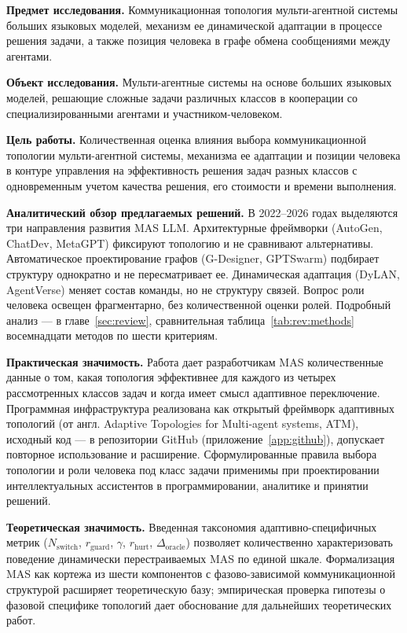 \textbf{Предмет исследования.} Коммуникационная топология
мульти-агентной системы больших языковых моделей, механизм
ее динамической адаптации в процессе решения задачи, а также
позиция человека в графе обмена сообщениями между агентами.

\textbf{Объект исследования.} Мульти-агентные системы на основе
больших языковых моделей, решающие сложные задачи различных
классов в кооперации со специализированными агентами и
участником-человеком.

\textbf{Цель работы.} Количественная оценка влияния выбора
коммуникационной топологии мульти-агентной системы, механизма
ее адаптации и позиции человека в контуре управления на
эффективность решения задач разных классов с одновременным
учетом качества решения, его стоимости и времени выполнения.

\textbf{Аналитический обзор предлагаемых решений.} В 2022--2026
годах выделяются три направления развития MAS LLM. Архитектурные
фреймворки (AutoGen, ChatDev, MetaGPT) фиксируют топологию и не
сравнивают альтернативы. Автоматическое проектирование графов
(G-Designer, GPTSwarm) подбирает структуру однократно и не
пересматривает ее. Динамическая адаптация (DyLAN, AgentVerse)
меняет состав команды, но не структуру связей. Вопрос роли человека
освещен фрагментарно, без количественной оценки ролей. Подробный
анализ --- в главе~\ref{sec:review}, сравнительная
таблица~\ref{tab:rev:methods} восемнадцати методов по шести
критериям.

\textbf{Практическая значимость.} Работа дает разработчикам MAS
количественные данные о том, какая топология эффективнее для
каждого из четырех рассмотренных классов задач и когда имеет
смысл адаптивное переключение. Программная инфраструктура
реализована как открытый фреймворк адаптивных топологий
(от англ. Adaptive Topologies for Multi-agent systems, ATM),
исходный код --- в репозитории GitHub (приложение~\ref{app:github}),
допускает повторное использование и расширение. Сформулированные
правила выбора топологии и роли человека под класс задачи применимы
при проектировании интеллектуальных ассистентов в программировании,
аналитике и принятии решений.

\textbf{Теоретическая значимость.} Введенная таксономия
адаптивно-специфичных метрик ($N_{\text{switch}}$, $r_{\text{guard}}$,
$\gamma$, $r_{\text{hurt}}$, $\Delta_{\text{oracle}}$) позволяет
количественно характеризовать поведение динамически перестраиваемых
MAS по единой шкале. Формализация MAS как кортежа из шести
компонентов с фазово-зависимой коммуникационной структурой
расширяет теоретическую базу; эмпирическая проверка гипотезы о
фазовой специфике топологий дает обоснование для дальнейших
теоретических работ.

